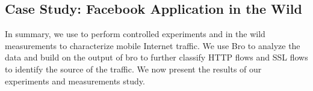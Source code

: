 \subsection{Case Study: Facebook Application in the Wild}

In summary, we use \platname to perform controlled experiments and in the wild measurements to characterize mobile Internet traffic. 
We use Bro to analyze the data and build on the output of bro to further classify HTTP flows and SSL flows to identify the source of the traffic. 
We now present the results of our experiments and measurements study. 






